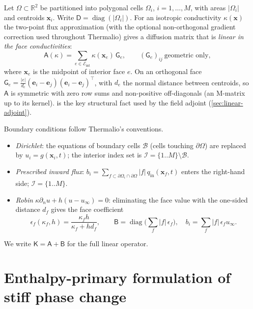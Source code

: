 \documentclass[11pt]{article}
\numberwithin{equation}{section}
\theoremstyle{remark}
\newcommand{\R}{\mathbb{R}}
\newcommand{\Dm}{\mathsf{D}}           %
\newcommand{\K}{\mathsf{K}}
\begin{document}
Let $\Omega\subset\R^2$ be partitioned into polygonal cells $\Omega_i$,
$i=1,\dots,M$, with areas $|\Omega_i|$ and centroids $\bm x_i$.  Write
$\Dm=\operatorname{diag}(|\Omega_i|)$.  For an isotropic conductivity
$\kappa(\bm x)$ the two-point flux approximation (with the optional
non-orthogonal gradient correction used throughout Thermalio) gives a
diffusion matrix that is \emph{linear in the face conductivities}:
\begin{equation}
  \mathsf A(\kappa) = \sum_{e\in\mathcal E_{\mathrm{int}}} \kappa(\bm x_e)\, \mathsf G_e,
  \qquad
  (\mathsf G_e)_{ij}\ \text{geometric only},
  \label{eq:A-decomposition}
\end{equation}
where $\bm x_e$ is the midpoint of interior face $e$.  On an orthogonal face
$\mathsf G_e = \frac{|e|}{d_e}(\bm e_i-\bm e_j)(\bm e_i-\bm e_j)^{\!\top}$, with
$d_e$ the normal distance between centroids, so $\mathsf A$ is symmetric with
zero row sums and non-positive off-diagonals (an M-matrix up to its kernel).
 is the key structural fact used by the field
adjoint (\cref{sec:linear-adjoint}).

Boundary conditions follow Thermalio's conventions.
\begin{itemize}[leftmargin=*]
\item \emph{Dirichlet}: the equations of boundary cells $\mathcal B$ (cells
  touching $\partial\Omega$) are replaced by $u_i=g(\bm x_i,t)$; the
  interior index set is $\mathcal I=\{1..M\}\setminus\mathcal B$.
\item \emph{Prescribed inward flux}: $b_i=\sum_{f\subset\partial\Omega_i\cap\partial\Omega}|f|\,q_{\mathrm{in}}(\bm x_f,t)$
  enters the right-hand side; $\mathcal I=\{1..M\}$.
\item \emph{Robin} $\kappa\partial_n u + h(u-u_\infty)=0$: eliminating the
  face value with the one-sided distance $d_f$ gives the face coefficient
  \begin{equation}
    \epsilon_f(\kappa_f,h) = \frac{\kappa_f h}{\kappa_f + h d_f},
    \qquad
    \mathsf B=\operatorname{diag}\Big(\textstyle\sum_f |f|\,\epsilon_f\Big),\quad
    b_i = \textstyle\sum_f |f|\,\epsilon_f u_\infty .
    \label{eq:robin}
  \end{equation}
\end{itemize}
We write $\K=\mathsf A+\mathsf B$ for the full linear operator.

\section{Enthalpy-primary formulation of stiff phase change}
\label{sec:enthalpy}
\end{document}
